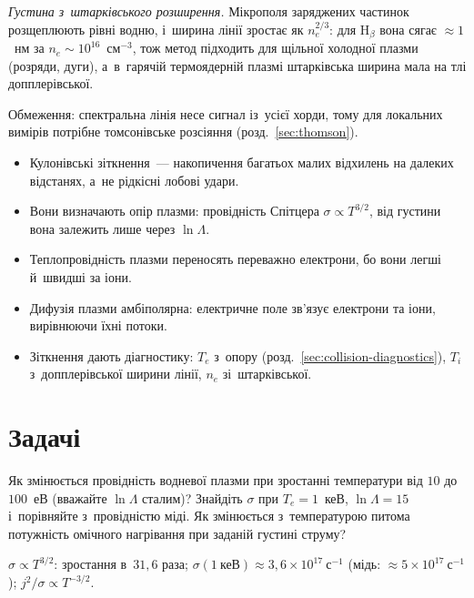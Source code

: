 \emph{Густина з~штарківського розширення.} Мікрополя заряджених частинок розщеплюють рівні водню, і~ширина лінії зростає як $n_e^{2/3}$:
для $\mathrm{H}_\beta$ вона сягає $\approx1$~нм за $n_e\sim10^{16}$~см$^{-3}$, тож метод підходить для щільної холодної плазми (розряди, дуги), а~в~гарячій
термоядерній плазмі штарківська ширина мала на тлі допплерівської.

Обмеження: спектральна лінія несе сигнал із~усієї хорди, тому для локальних вимірів потрібне томсонівське розсіяння (розд.~\ref{sec:thomson}).

\begin{Summary}
\begin{itemize}
\item Кулонівські зіткнення~--- накопичення багатьох малих відхилень на далеких відстанях, а~не рідкісні лобові удари.
\item Вони визначають опір плазми: провідність Спітцера $\sigma\propto T^{3/2}$, від густини вона залежить лише через $\ln\Lambda$.
\item Теплопровідність плазми переносять переважно електрони, бо вони легші й~швидші за іони.
\item Дифузія плазми амбіполярна: електричне поле зв'язує електрони та іони, вирівнюючи їхні потоки.
\item Зіткнення дають діагностику: $T_e$ з~опору (розд.~\ref{sec:collision-diagnostics}), $T_i$ з~допплерівської ширини лінії, $n_e$ зі~штарківської.
\end{itemize}
\end{Summary}

\section*{Задачі}

\begin{problem}\label{prb:PlasmaConductivity}
	Як змінюється провідність водневої плазми при зростанні температури від $10$ до
	$100$~еВ (вважайте $\ln\Lambda$ сталим)? Знайдіть $\sigma$ при $T_e=1$~кеВ, $\ln\Lambda=15$ і~порівняйте з~провідністю міді. Як змінюється
	з~температурою питома потужність омічного нагрівання при заданій густині струму?
	\begin{solution}
		$\sigma\propto T^{3/2}$: зростання в~$31{,}6$ раза; $\sigma(1~\text{кеВ})\approx3{,}6\times10^{17}~\mathrm{с}^{-1}$ (мідь: $\approx5\times10^{17}~\mathrm{с}^{-1}$); $j^2/\sigma\propto T^{-3/2}$.
	\end{solution}
\end{problem}

